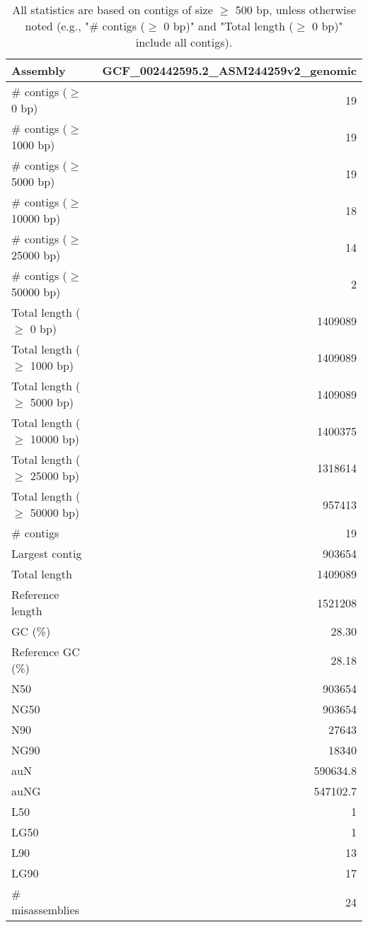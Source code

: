 \documentclass[12pt,a4paper]{article}
\begin{document}
\begin{table}[ht]
\begin{center}
\caption{All statistics are based on contigs of size $\geq$ 500 bp, unless otherwise noted (e.g., "\# contigs ($\geq$ 0 bp)" and "Total length ($\geq$ 0 bp)" include all contigs).}
\begin{tabular}{|l*{1}{|r}|}
\hline
Assembly & GCF\_002442595.2\_ASM244259v2\_genomic \\ \hline
\# contigs ($\geq$ 0 bp) & 19 \\ \hline
\# contigs ($\geq$ 1000 bp) & 19 \\ \hline
\# contigs ($\geq$ 5000 bp) & 19 \\ \hline
\# contigs ($\geq$ 10000 bp) & 18 \\ \hline
\# contigs ($\geq$ 25000 bp) & 14 \\ \hline
\# contigs ($\geq$ 50000 bp) & 2 \\ \hline
Total length ($\geq$ 0 bp) & 1409089 \\ \hline
Total length ($\geq$ 1000 bp) & 1409089 \\ \hline
Total length ($\geq$ 5000 bp) & 1409089 \\ \hline
Total length ($\geq$ 10000 bp) & 1400375 \\ \hline
Total length ($\geq$ 25000 bp) & 1318614 \\ \hline
Total length ($\geq$ 50000 bp) & 957413 \\ \hline
\# contigs & 19 \\ \hline
Largest contig & 903654 \\ \hline
Total length & 1409089 \\ \hline
Reference length & 1521208 \\ \hline
GC (\%) & 28.30 \\ \hline
Reference GC (\%) & 28.18 \\ \hline
N50 & 903654 \\ \hline
NG50 & 903654 \\ \hline
N90 & 27643 \\ \hline
NG90 & 18340 \\ \hline
auN & 590634.8 \\ \hline
auNG & 547102.7 \\ \hline
L50 & 1 \\ \hline
LG50 & 1 \\ \hline
L90 & 13 \\ \hline
LG90 & 17 \\ \hline
\# misassemblies & 24 \\ \hline

\end{tabular}
\end{center}
\end{table}
\end{document}

